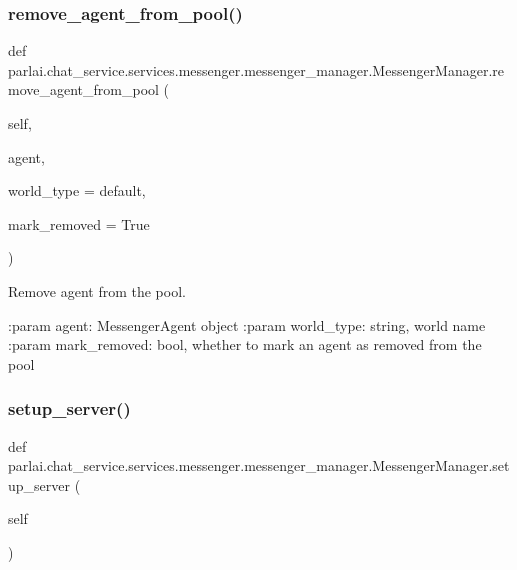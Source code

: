 \subsubsection{\texorpdfstring{remove\+\_\+agent\+\_\+from\+\_\+pool()}{remove\_agent\_from\_pool()}}
{\footnotesize\ttfamily def parlai.\+chat\+\_\+service.\+services.\+messenger.\+messenger\+\_\+manager.\+Messenger\+Manager.\+remove\+\_\+agent\+\_\+from\+\_\+pool (\begin{DoxyParamCaption}\item[{}]{self,  }\item[{}]{agent,  }\item[{}]{world\+\_\+type = {\ttfamily \textquotesingle{}default\textquotesingle{}},  }\item[{}]{mark\+\_\+removed = {\ttfamily True} }\end{DoxyParamCaption})}

\begin{DoxyVerb}Remove agent from the pool.

:param agent:
    MessengerAgent object
:param world_type:
    string, world name
:param mark_removed:
    bool, whether to mark an agent as removed from the pool
\end{DoxyVerb}
 \mbox{\label{classparlai_1_1chat__service_1_1services_1_1messenger_1_1messenger__manager_1_1MessengerManager_adb6559f9e8cca74e2ac94d443f36f9d2}} 
\subsubsection{\texorpdfstring{setup\+\_\+server()}{setup\_server()}}
{\footnotesize\ttfamily def parlai.\+chat\+\_\+service.\+services.\+messenger.\+messenger\+\_\+manager.\+Messenger\+Manager.\+setup\+\_\+server (\begin{DoxyParamCaption}\item[{}]{self }\end{DoxyParamCaption})}

